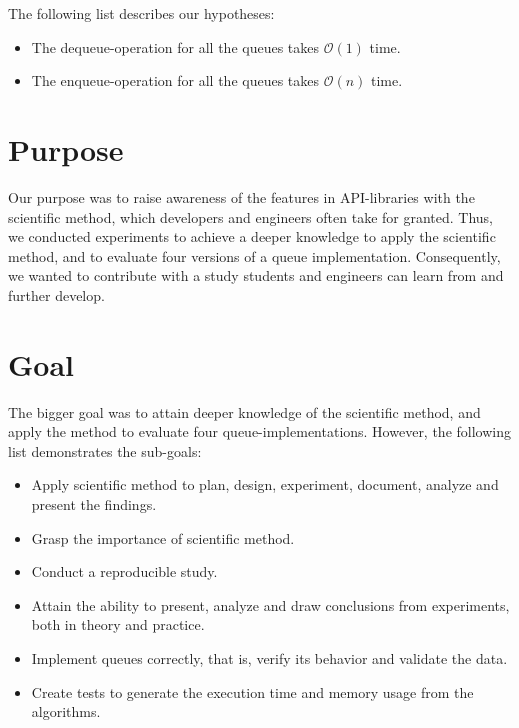 \documentclass[a4paper,11pt]{kth-mag}
\newcommand*{\skippara}{\par\vspace{\baselineskip} \noindent}
\begin{document}
\skippara The following list describes our hypotheses:
\begin{itemize}
    \item The dequeue-operation for all the queues takes $\mathcal{O}(1)$ time.
    \item The enqueue-operation for all the queues takes $\mathcal{O}(n)$ time.
\end{itemize}

\section{Purpose}
Our purpose was to raise awareness of the features in API-libraries with the scientific method, which developers and engineers often take for granted.
Thus, we conducted experiments to achieve a deeper knowledge to apply the scientific method, and to evaluate four versions of a queue implementation.
Consequently, we wanted to contribute with a study students and engineers can learn from and further develop.

\section{Goal}
The bigger goal was to attain deeper knowledge of the scientific method, and apply the method to evaluate four queue-implementations.
However, the following list demonstrates the sub-goals:
\begin{itemize}
    \item Apply scientific method to plan, design, experiment, document, analyze and present the findings.
    \item Grasp the importance of scientific method.
    \item Conduct a reproducible study.
    \item Attain the ability to present, analyze and draw conclusions from experiments, both in theory and practice.
    \item Implement queues correctly, that is, verify its behavior and validate the data.
    \item Create tests to generate the execution time and memory usage from the algorithms.
\end{itemize}

\end{document}
